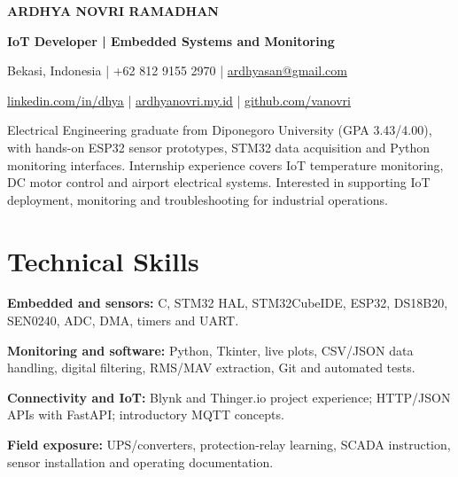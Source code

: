 \documentclass[11pt,a4paper]{article}
\begin{document}
\begin{center}
{\fontsize{20}{23}\selectfont\bfseries ARDHYA NOVRI RAMADHAN}\par
\vspace{3pt}
{\bfseries IoT Developer | Embedded Systems and Monitoring}\par
Bekasi, Indonesia | +62 812 9155 2970 | \href{mailto:ardhyasan@gmail.com}{ardhyasan@gmail.com}\par
\href{https://www.linkedin.com/in/dhya/}{linkedin.com/in/dhya} | \href{https://ardhyanovri.my.id}{ardhyanovri.my.id} | \href{https://github.com/vanovri}{github.com/vanovri}
\end{center}
\raggedright
Electrical Engineering graduate from Diponegoro University (GPA 3.43/4.00), with hands-on ESP32 sensor prototypes, STM32 data acquisition and Python monitoring interfaces. Internship experience covers IoT temperature monitoring, DC motor control and airport electrical systems. Interested in supporting IoT deployment, monitoring and troubleshooting for industrial operations.\par
\section{Technical Skills}
\textbf{Embedded and sensors:} C, STM32 HAL, STM32CubeIDE, ESP32, DS18B20, SEN0240, ADC, DMA, timers and UART.\par
\textbf{Monitoring and software:} Python, Tkinter, live plots, CSV/JSON data handling, digital filtering, RMS/MAV extraction, Git and automated tests.\par
\textbf{Connectivity and IoT:} Blynk and Thinger.io project experience; HTTP/JSON APIs with FastAPI; introductory MQTT concepts.\par
\textbf{Field exposure:} UPS/converters, protection-relay learning, SCADA instruction, sensor installation and operating documentation.\par
\end{document}
